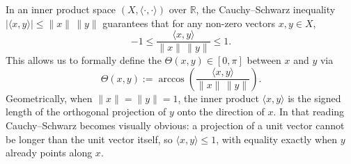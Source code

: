 
\begin{remark}
\label{rem:inner_product_angle_geometry}
In an inner product space $(X, \langle\cdot,\cdot\rangle)$ over $\mathbb{R}$, the Cauchy--Schwarz inequality $|\langle x, y\rangle| \leq \|x\|\,\|y\|$ guarantees that for any non-zero vectors $x, y \in X$,
\[
-1 \leq \frac{\langle x, y\rangle}{\|x\|\,\|y\|} \leq 1.
\]
This allows us to formally define the  $\Theta(x,y) \in [0,\pi]$ between $x$ and $y$ via
\[
\Theta(x,y) := \arccos\left(\frac{\langle x, y\rangle}{\|x\|\,\|y\|}\right).
\]
Geometrically, when $\|x\| = \|y\| = 1$, the inner product $\langle x, y\rangle$ is the signed
length of the orthogonal projection of $y$ onto the direction of $x$. In that reading
Cauchy--Schwarz becomes visually obvious: a projection of a unit vector cannot be longer than the
unit vector itself, so $\langle x,y\rangle \leq 1$, with equality exactly when $y$ already points
along $x$.
\begin{center}
\end{center}
\end{remark}
